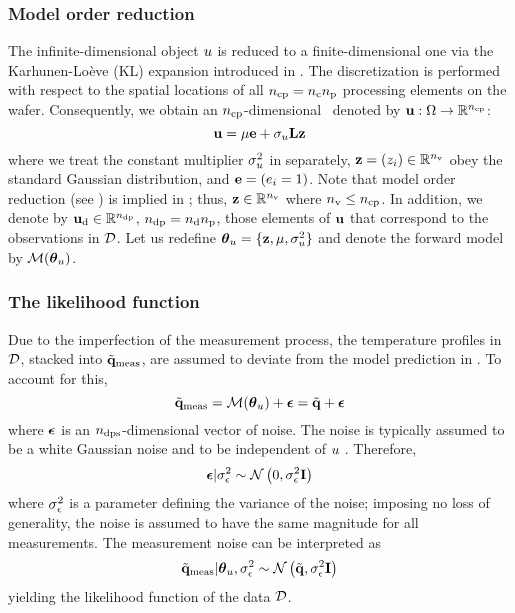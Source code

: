 \subsubsection{Model order reduction} 
The infinite-dimensional object $u$ is reduced to a finite-dimensional one via the Karhunen-Lo\`{e}ve (KL) expansion introduced in . The discretization is performed with respect to the spatial locations of all ${n_\text{cp}} = {n_{\text{c}}} {n_\text{p}}$ processing elements on the wafer. Consequently, we obtain an ${n_\text{cp}}$-dimensional \rv\ denoted by $\mathbf{u}: \Omega \to \mathbb{R}^{n_\text{cp}}$:
\begin{equation} \elabel{kl-approximation}
  \vu = \mu \vI + \sigma_\u \mKL \vz
\end{equation}
where we treat the constant multiplier $\sigma^2_u$ in  separately, $\mathbf{z} = (z_i) \in \mathbb{R}^{n_\text{v}}$ obey the standard Gaussian distribution, and $\mathbf{e} = (e_i = 1)$. Note that model order reduction (see ) is implied in ; thus, $\mathbf{z} \in \mathbb{R}^{n_\text{v}}$ where ${n_\text{v}} \leq {n_\text{cp}}$. In addition, we denote by $\mathbf{u}_{\text{d}} \in \mathbb{R}^{{n_\text{dp}}}$, ${n_\text{dp}} = {n_{\text{d}}} {n_\text{p}}$, those elements of $\mathbf{u}$ that correspond to the observations in $\mathcal{D}$. Let us redefine ${\boldsymbol\theta}_u = \{ \mathbf{z}, \mu, \sigma^2_u \}$ and denote the forward model by $\model{\vparam_\u}$.

\subsubsection{The likelihood function}
Due to the imperfection of the measurement process, the temperature profiles in $\mathcal{D}$, stacked into $\tilde{\mathbf{q}}_{\text{meas}}$, are assumed to deviate from the model prediction in . To account for this,
\[
  \mvT_\meas = \model{\vparam_\u} + \vnoise = \mvT + \vnoise
\]
where $\boldsymbol\epsilon$ is an ${n_\text{dps}}$-dimensional vector of noise. The noise is typically assumed to be a white Gaussian noise and to be independent of $u$ \cite{rasmussen2006, marzouk2009}. Therefore,
\[
  \boldsymbol\epsilon | \sigma^2_\epsilon \sim \mathcal{N}\left( 0, \sigma^2_\epsilon \mathbf{I} \right)
\]
where $\sigma^2_\epsilon$ is a parameter defining the variance of the noise; imposing no loss of generality, the noise is assumed to have the same magnitude for all measurements. The measurement noise can be interpreted as
\begin{equation} \elabel{likelihood}
  \mvT_\meas | \vparam_\u, \sigma_\noise^2 \sim \gaussian{\mvT}{\sigma_\noise^2 \mI}
\end{equation}
yielding the likelihood function of the data $\mathcal{D}$.


